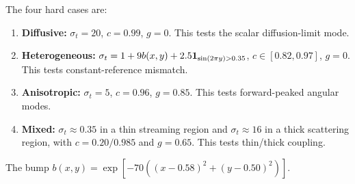 \documentclass[11pt]{article}
\begin{document}
The four hard cases are:
\begin{enumerate}
\item \textbf{Diffusive:}
\(\sigma_t=20\), \(c=0.99\), \(g=0\). This tests the scalar
diffusion-limit mode.
\item \textbf{Heterogeneous:}
\(\sigma_t=1+9b(x,y)+2.5{\bf 1}_{\sin(2\pi y)>0.35}\),
\(c\in[0.82,0.97]\), \(g=0\). This tests constant-reference mismatch.
\item \textbf{Anisotropic:}
\(\sigma_t=5\), \(c=0.96\), \(g=0.85\). This tests forward-peaked angular
modes.
\item \textbf{Mixed:}
\(\sigma_t\approx0.35\) in a thin streaming region and
\(\sigma_t\approx16\) in a thick scattering region, with \(c=0.20/0.985\) and
\(g=0.65\). This tests thin/thick coupling.
\end{enumerate}
The bump \(b(x,y)=\exp[-70((x-0.58)^2+(y-0.50)^2)]\).
\end{document}
